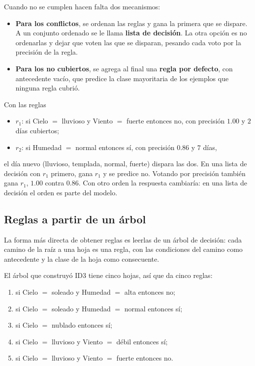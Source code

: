 \documentclass[11pt,letterpaper]{article}
\begin{document}
Cuando no se cumplen hacen falta dos mecanismos:

\begin{itemize}[itemsep=0.3em]
    \item \textbf{Para los conflictos}, se ordenan las reglas y gana la
          primera que se dispare. A un conjunto ordenado se le llama
          \textbf{lista de decisión}. La otra opción es no ordenarlas y
          dejar que voten las que se disparan, pesando cada voto por la
          precisión de la regla.
    \item \textbf{Para los no cubiertos}, se agrega al final una
          \textbf{regla por defecto}, con antecedente vacío, que
          predice la clase mayoritaria de los ejemplos que ninguna
          regla cubrió.
\end{itemize}

\begin{ejemplo}[Un conflicto]
    Con las reglas
    \begin{itemize}[itemsep=0.2em]
        \item $r_1$: si Cielo $=$ lluvioso y Viento $=$ fuerte entonces
              no, con precisión $1.00$ y $2$ días cubiertos;
        \item $r_2$: si Humedad $=$ normal entonces sí, con precisión
              $0.86$ y $7$ días,
    \end{itemize}
    el día nuevo (lluvioso, templada, normal, fuerte) dispara las dos.
    En una lista de decisión con $r_1$ primero, gana $r_1$ y se predice
    no. Votando por precisión también gana $r_1$, $1.00$ contra $0.86$.
    Con otro orden la respuesta cambiaría: en una lista de decisión el
    orden es parte del modelo.
\end{ejemplo}


\subsection*{Reglas a partir de un árbol}

La forma más directa de obtener reglas es leerlas de un árbol de
decisión: cada camino de la raíz a una hoja es una regla, con las
condiciones del camino como antecedente y la clase de la hoja como
consecuente.

\begin{ejemplo}
    El árbol que construyó ID3 tiene cinco hojas, así que da cinco
    reglas:
    \begin{enumerate}[itemsep=0.2em]
        \item si Cielo $=$ soleado y Humedad $=$ alta entonces no;
        \item si Cielo $=$ soleado y Humedad $=$ normal entonces sí;
        \item si Cielo $=$ nublado entonces sí;
        \item si Cielo $=$ lluvioso y Viento $=$ débil entonces sí;
        \item si Cielo $=$ lluvioso y Viento $=$ fuerte entonces no.
    \end{enumerate}
\end{ejemplo}
\end{document}
